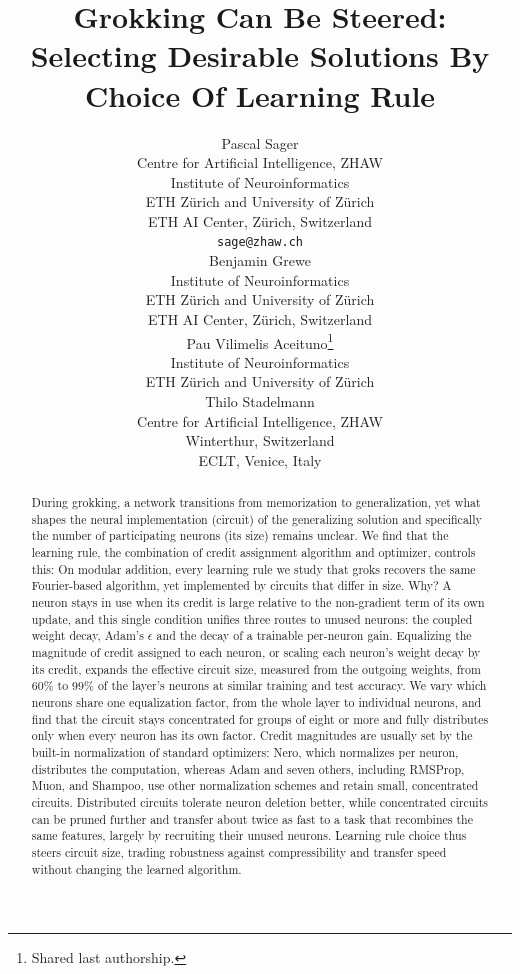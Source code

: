\documentclass{article} %
\title{Grokking Can Be Steered: Selecting Desirable Solutions By Choice Of Learning Rule}%
\author{ Pascal Sager \\
Centre for Artificial Intelligence, ZHAW \\
Institute of Neuroinformatics \\
ETH Z\"urich and University of Z\"urich \\
ETH AI Center, Z\"urich, Switzerland \\
\texttt{sage@zhaw.ch} \\
\AND Benjamin Grewe \\
Institute of Neuroinformatics \\
ETH Z\"urich and University of Z\"urich \\
ETH AI Center, Z\"urich, Switzerland \\
\And Pau Vilimelis Aceituno\thanks{Shared last authorship.} \\
Institute of Neuroinformatics \\
ETH Z\"urich and University of Z\"urich \\
\And Thilo Stadelmann\footnotemark[1] \\
Centre for Artificial Intelligence, ZHAW \\
Winterthur, Switzerland \\
ECLT, Venice, Italy }
\begin{document}
\maketitle

\begin{abstract}
During grokking, a network transitions from memorization to generalization, yet what shapes the neural implementation (circuit) of the generalizing solution and specifically the number of participating neurons (its size) remains unclear. We find that the learning rule, the combination of credit assignment algorithm and optimizer, controls this: On modular addition, every learning rule we study that groks recovers the same Fourier-based algorithm, yet implemented by circuits that differ in size. Why? A neuron stays in use when its credit is large relative to the non-gradient term of its own update, and this single condition unifies three routes to unused neurons: the coupled weight decay, Adam's $\epsilon$ and the decay of a trainable per-neuron gain. Equalizing the magnitude of credit assigned to each neuron, or scaling each neuron's weight decay by its credit, expands the effective circuit size, measured from the outgoing weights, from $60\%$ to $99\%$ of the layer's neurons at similar training and test accuracy. We vary which neurons share one equalization factor, from the whole layer to individual neurons, and find that the circuit stays concentrated for groups of eight or more and fully distributes only when every neuron has its own factor. Credit magnitudes are usually set by the built-in normalization of standard optimizers: Nero, which normalizes per neuron, distributes the computation, whereas Adam and seven others, including RMSProp, Muon, and Shampoo, use other normalization schemes and retain small, concentrated circuits. Distributed circuits tolerate neuron deletion better, while concentrated circuits can be pruned further and transfer about twice as fast to a task that recombines the same features, largely by recruiting their unused neurons. Learning rule choice thus steers circuit size, trading robustness against compressibility and transfer speed without changing the learned algorithm.
\end{abstract}
\end{document}
